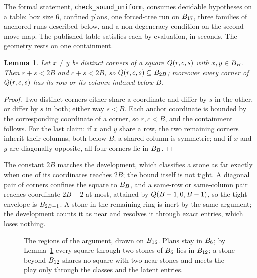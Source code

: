 \documentclass[11pt]{amsart}
\newtheorem{lemma}[theorem]{Lemma}
\theoremstyle{definition}
\theoremstyle{remark}
\begin{document}
The formal statement, \texttt{check\_sound\_uniform}, consumes
decidable hypotheses on a table: box size $6$, confined plans, one
forced-tree run on $B_{17}$, three families of anchored runs
described below, and a non-degeneracy condition on the second-move
map. The published table satisfies each by evaluation, in seconds.
The geometry rests on one containment.

\begin{lemma}\label{lem:span}
Let $x \ne y$ be distinct corners of a square $Q(r,c,s)$ with
$x, y \in B_B$. Then $r + s < 2B$ and $c + s < 2B$, so
$Q(r,c,s) \subseteq B_{2B}$; moreover every corner of
$Q(r,c,s)$ has its row or its column indexed below $B$.
\end{lemma}

\begin{proof}
Two distinct corners either share a coordinate and differ by $s$ in
the other, or differ by $s$ in both; either way $s < B$. Each anchor
coordinate is bounded by the corresponding coordinate of a corner, so
$r, c < B$, and the containment follows. For the last claim: if $x$
and $y$ share a row, the two remaining corners inherit their columns,
both below $B$; a shared column is symmetric; and if $x$ and $y$ are
diagonally opposite, all four corners lie in $B_B$.
\end{proof}

The constant $2B$ matches the development, which classifies a stone
as far exactly when one of its coordinates reaches $2B$; the bound
itself is not tight. A diagonal pair of corners confines the square
to $B_B$, and a same-row or same-column pair reaches coordinate
$2B - 2$ at most, attained by $Q(B-1, 0, B-1)$, so the tight
envelope is $B_{2B-1}$. A stone in the remaining ring is inert
by the same argument; the development counts it as near and resolves
it through exact entries, which loses nothing.

\begin{figure}[ht]
\centering
{}
\caption{The regions of the argument, drawn on $B_{16}$. Plans
stay in $B_6$; by Lemma~\ref{lem:span} every square through two
stones of $B_6$ lies in $B_{12}$; a stone beyond
$B_{12}$ shares no square with two near stones and meets the
play only through the classes and the latent entries.}
\label{fig:zones}
\end{figure}
\end{document}
